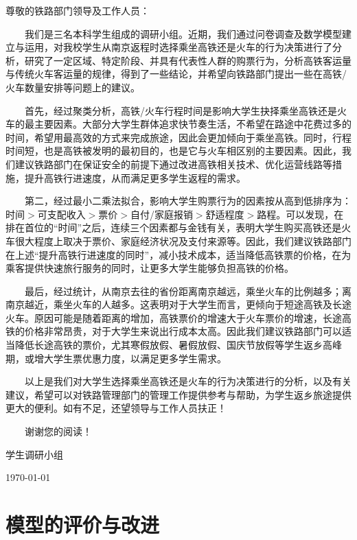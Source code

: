 \documentclass{ctexart}
\begin{document}
\begin{tcolorbox}[colback=red!5!white,colframe=red!75!black,title=供铁路管理部门参考与决策的建议书,center title]
	\kaishu
	尊敬的铁路部门领导及工作人员：

	~~~~我们是三名本科学生组成的调研小组。近期，我们通过问卷调查及数学模型建立与运用，对我校学生从南京返程时选择乘坐高铁还是火车的行为决策进行了分析，研究了一定区域、特定阶段、并具有代表性人群的购票行为，分析高铁客运量与传统火车客运量的规律，得到了一些结论，并希望向铁路部门提出一些在高铁/火车数量安排等问题上的建议。

	~~~~首先，经过聚类分析，高铁/火车行程时间是影响大学生抉择乘坐高铁还是火车的最主要因素。大部分大学生群体追求快节奏生活，不希望在路途中花费过多的时间，希望用最高效的方式来完成旅途，因此会更加倾向于乘坐高铁。同时，行程时间短，也是高铁被发明的最初目的，也是它与火车相区别的主要因素。因此，我们建议铁路部门在保证安全的前提下通过改进高铁相关技术、优化运营线路等措施，提升高铁行进速度，从而满足更多学生返程的需求。

	~~~~第二，经过最小二乘法拟合，影响大学生购票行为的因素按从高到低排序为：时间$>$可支配收入$>$票价$>$自付/家庭报销$>$舒适程度$>$路程。可以发现，在排在首位的\enquote{时间}之后，连续三个因素都与金钱有关，表明大学生购买高铁还是火车很大程度上取决于票价、家庭经济状况及支付来源等。因此，我们建议铁路部门在上述\enquote{提升高铁行进速度的同时}，减小技术成本，适当降低高铁票的价格，在为乘客提供快速旅行服务的同时，让更多大学生能够负担高铁的价格。

	~~~~最后，经过统计，从南京去往的省份距离南京越远，乘坐火车的比例越多；离南京越近，乘坐火车的人越多。这表明对于大学生而言，更倾向于短途高铁及长途火车。原因可能是随着距离的增加，高铁票价的增速大于火车票价的增速，长途高铁的价格非常昂贵，对于大学生来说出行成本太高。因此我们建议铁路部门可以适当降低长途高铁的票价，尤其寒假放假、暑假放假、国庆节放假等学生返乡高峰期，或增大学生票优惠力度，以满足更多学生需求。

	~~~~以上是我们对大学生选择乘坐高铁还是火车的行为决策进行的分析，以及有关建议，希望可以对铁路管理部门的管理工作提供参考与帮助，为学生返乡旅途提供更大的便利。如有不足，还望领导与工作人员扶正！

	~~~~谢谢您的阅读！

	\tcblower
	\kaishu
	\begin{flushright}
		学生调研小组

		\today
	\end{flushright}
\end{tcolorbox}

\section{模型的评价与改进}%
\label{sec:模型的评价与改进}
\end{document}
